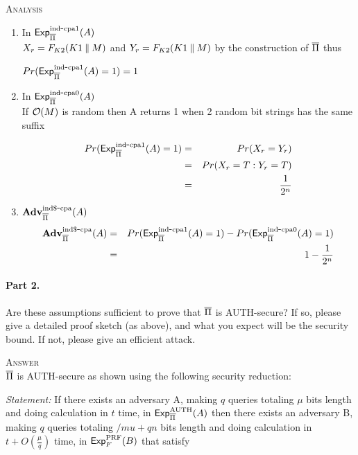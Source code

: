 \documentclass[11pt]{article}
\begin{document}
\textsc{Analysis}\\
\begin{enumerate}
\item In $\mathsf{Exp}^{\mathrm{ind}\mbox{-}\mathrm{cpa1}}_{\overline{\Pi}}{(A)}$\\
$X_r = F_{K2}(K1 \:\|\: M)$ and $Y_r = F_{K2}(K1 \:\|\: M)$ by the construction of $\overline{\Pi}$ thus\\
\begin{center}
 $Pr(\mathsf{Exp}^{\mathrm{ind}\mbox{-}\mathrm{cpa1}}_{\overline{\Pi}}{(A)}=1) =1$
\end{center}

\item In $\mathsf{Exp}^{\mathrm{ind}\mbox{-}\mathrm{cpa0}}_{\overline{\Pi}}{(A)}$\\
If ${\cal O} (M)$ is random then A returns 1 when 2 random bit strings has the same suffix 

\begin{eqnarray*}
Pr(\mathsf{Exp}^{\mathrm{ind}\mbox{-}\mathrm{cpa1}}_{\overline{\Pi}}{(A)}=1) &=& Pr (X_r = Y_r)\\
&=& Pr (X_r = T: Y_r = T)\\
&=& \frac{1}{2^n}
\end{eqnarray*}

\item ${\mathbf{\bf Adv}}^{\mathrm{ind\$}\mbox{-}\mathrm{cpa}}_{\overline{\Pi}}(A)$\\

\begin{eqnarray*}
{\mathbf{\bf Adv}}^{\mathrm{ind\$}\mbox{-}\mathrm{cpa}}_{\overline{\Pi}}(A) &=& Pr(\mathsf{Exp}^{\mathrm{ind}\mbox{-}\mathrm{cpa1}}_{\overline{\Pi}}{(A)}=1)-Pr(\mathsf{Exp}^{\mathrm{ind}\mbox{-}\mathrm{cpa0}}_{\overline{\Pi}}{(A)}=1)\\
&=& 1 - \frac{1}{2^n}
\end{eqnarray*}

\end{enumerate}

\paragraph{Part 2.} Are these assumptions sufficient to prove that $\overline{\Pi}$ is AUTH-secure?
If so, please give a detailed proof sketch (as above), and what you
expect will be the security bound.  If not, please give an efficient attack.

\textsc{Answer}\\
$\overline{\Pi}$ is AUTH-secure as shown using the following security reduction:

\textit{Statement: } If there exists an adversary A, making $q$ queries totaling $\mu$ bits length and doing calculation in $t$ time, in $\mathsf{Exp}^{\mathrm{AUTH}}_{\overline{\Pi}}{(A)}$ then there exists an adversary B, making $q$ queries totaling $/mu + qn$ bits length and doing calculation in $t + O(\frac{\mu}{q})$ time, in $\mathsf{Exp}^{\mathrm{PRF}}_{F}{(B)}$ that satisfy
\end{document}
